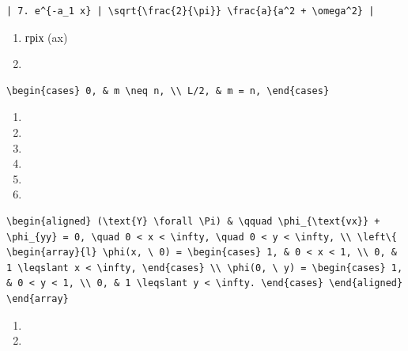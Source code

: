\documentclass[
  ukrainian,
]{article}
\providecommand{\tightlist}{%
  \setlength{\itemsep}{0pt}\setlength{\parskip}{0pt}}
\begin{document}
\begin{verbatim}
| 7. e^{-a_1 x} | \sqrt{\frac{2}{\pi}} \frac{a}{a^2 + \omega^2} |
\end{verbatim}

\begin{enumerate}
\def\labelenumi{\arabic{enumi}.}
\setcounter{enumi}{19}
\item
  гріх (ax)
\item
\end{enumerate}

\begin{verbatim}
\begin{cases} 0, & m \neq n, \\ L/2, & m = n, \end{cases}
\end{verbatim}

\begin{enumerate}
\def\labelenumi{\arabic{enumi}.}
\setcounter{enumi}{10}
\tightlist
\item
\item
\item
\item
\item
\item
\end{enumerate}

\begin{verbatim}
\begin{aligned} (\text{Y} \forall \Pi) & \qquad \phi_{\text{vx}} + \phi_{yy} = 0, \quad 0 < x < \infty, \quad 0 < y < \infty, \\ \left\{ \begin{array}{l} \phi(x, \ 0) = \begin{cases} 1, & 0 < x < 1, \\ 0, & 1 \leqslant x < \infty, \end{cases} \\ \phi(0, \ y) = \begin{cases} 1, & 0 < y < 1, \\ 0, & 1 \leqslant y < \infty. \end{cases} \end{aligned} \end{array}
\end{verbatim}

\begin{enumerate}
\def\labelenumi{\arabic{enumi}.}
\setcounter{enumi}{16}
\tightlist
\item
\item
\end{enumerate}
\end{document}
